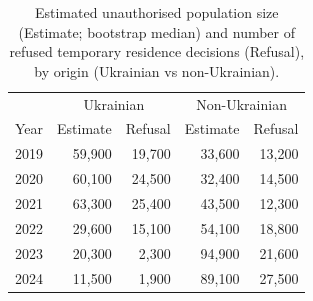\begin{table}[H]
\centering
\caption{\label{tbl-comparison-ukr}Estimated unauthorised population size (Estimate; bootstrap median) and number of refused temporary residence decisions (Refusal), by origin (Ukrainian vs non-Ukrainian).}
\begin{tabular}{lrr|rr} \toprule
& \multicolumn{2}{c|}{Ukrainian} & \multicolumn{2}{c}{Non-Ukrainian} \\
Year & Estimate & Refusal & Estimate & Refusal \\ \midrule
2019 & 59,900 & 19,700 & 33,600 & 13,200 \\
2020 & 60,100 & 24,500 & 32,400 & 14,500 \\
2021 & 63,300 & 25,400 & 43,500 & 12,300 \\
2022 & 29,600 & 15,100 & 54,100 & 18,800 \\
2023 & 20,300 & 2,300 & 94,900 & 21,600 \\
2024 & 11,500 & 1,900 & 89,100 & 27,500 \\
\bottomrule
\end{tabular}
\end{table}
